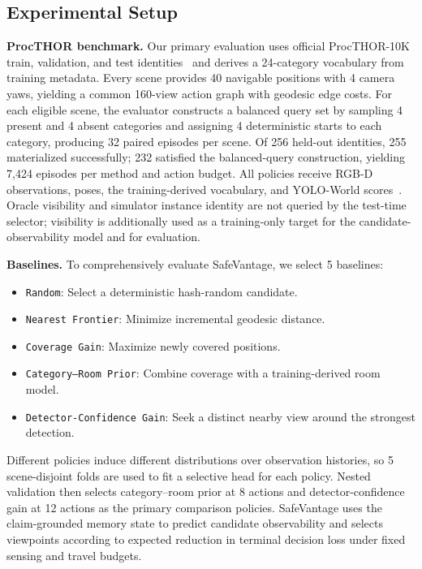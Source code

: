 \documentclass[letterpaper, 10 pt, conference]{ieeeconf}
\newcommand{\method}{SafeVantage}
\newcommand{\taskitem}[2]{%
       \item \texttt{#1}: #2%
     }
\begin{document}
    \subsection{Experimental Setup}
    \textbf{ProcTHOR benchmark.}
    Our primary evaluation uses official ProcTHOR-10K train, validation, and test identities~\citep{deitke2022procthor} and derives a 24-category vocabulary from training metadata.  Every scene provides 40 navigable positions with 4 camera yaws, yielding a common 160-view action graph with geodesic edge costs. For each eligible scene, the evaluator constructs a balanced query set by sampling 4 present and 4 absent categories and assigning 4 deterministic starts to each category, producing 32 paired episodes per scene. Of 256 held-out identities, 255 materialized successfully; 232 satisfied the balanced-query construction, yielding 7,424 episodes per method and action budget. All policies receive RGB-D observations, poses, the training-derived vocabulary, and YOLO-World scores~\citep{cheng2024yoloworld}. Oracle visibility and simulator instance identity are not queried by the test-time selector; visibility is additionally used as a training-only target for the candidate-observability model and for evaluation.

    \textbf{Baselines.} 
    To comprehensively evaluate \method{}, we select 5 baselines:

    \begin{itemize}
       \setlength{\itemsep}{0pt}
       \setlength{\parskip}{0pt}
       \setlength{\parsep}{0pt}

       \taskitem{Random}
       {Select a deterministic hash-random candidate.}

       \taskitem{Nearest Frontier}
        {Minimize incremental geodesic distance.}

       \taskitem{Coverage Gain}
       {Maximize newly covered positions.}

       \taskitem{Category–Room Prior}
       {Combine coverage with a training-derived room model.}

       \taskitem{Detector-Confidence Gain}
       {Seek a distinct nearby view around the strongest detection.}
    \end{itemize}

    Different policies induce different distributions over observation histories, so 5 scene-disjoint folds are used to fit a selective head for each policy. Nested validation then selects category–room prior at 8 actions and detector-confidence gain at 12 actions as the primary comparison policies. \method{} uses the claim-grounded memory state to predict candidate observability and selects viewpoints according to expected reduction in terminal decision loss under fixed sensing and travel budgets.
    
\end{document}
